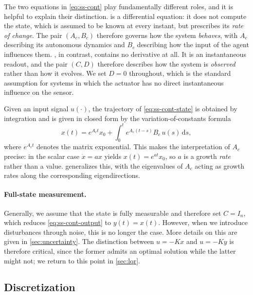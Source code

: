 The two equations in \eqref{eq:ss-cont} play fundamentally different roles, and
it is helpful to explain their distinction.
 is a differential equation: it does not compute the
state, which is assumed to be known at every instant, but prescribes its
\emph{rate of change}. The pair $(A_c, B_c)$ therefore governs how the system
\emph{behaves}, with $A_c$ describing its autonomous dynamics and
$B_c$ describing how the input of the agent influences them. , in contrast, 
contains no derivative at all. It is an instantaneous readout, and the pair $(C, D)$ therefore
describes how the system is \emph{observed} rather than how it evolves. We set
$D = 0$ throughout, which is the standard assumption for systems in which the
actuator has no direct instantaneous influence on the sensor.
 
Given an input signal $u(\cdot)$, the trajectory of \eqref{eq:ss-cont-state} is
obtained by integration and is given in closed form by the variation-of-constants
formula
\begin{equation}
    \label{eq:variation-of-constants}
    x(t) = e^{A_c t} x_0 + \int_{0}^{t} e^{A_c (t - s)} B_c\, u(s)\, \mathrm{d}s ,
\end{equation}
where $e^{A_c t}$ denotes the matrix exponential. This
makes the interpretation of $A_c$ precise: in the scalar case
$\dot{x} = a x$ yields $x(t) = e^{at} x_0$, so $a$ is a growth \emph{rate}
rather than a value.  generalizes this, with the
eigenvalues of $A_c$ acting as growth rates along the corresponding
eigendirections.
 
\paragraph{Full-state measurement.}
Generally, we assume that the state is fully
measurable and therefore set $C = I_n$, which reduces
\eqref{eq:ss-cont-output} to $y(t) = x(t)$. However, when we introduce disturbances
through noise, this is no longer the case. More details on this are
given in \cref{sec:uncertainty}. The distinction between $u = -Kx$ and $u = -Ky$ is
therefore critical, since the former admits an optimal solution while the
latter might not; we return to this point in \cref{sec:lqr}.
 
\subsection{Discretization}
\label{subsec:discretization}
 
